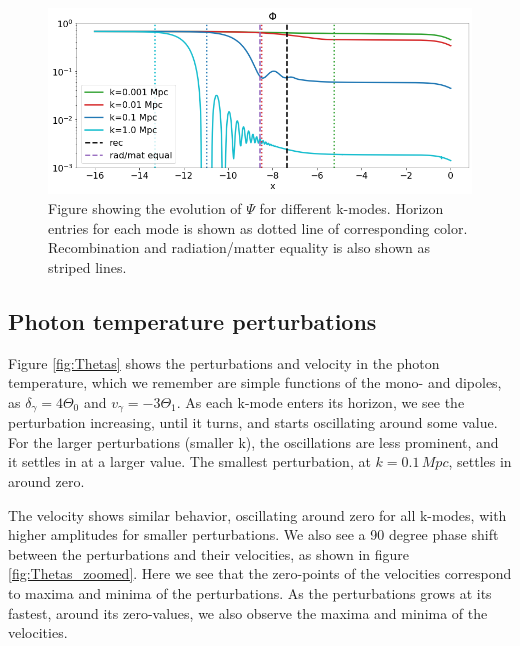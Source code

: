 \documentclass[10pt, a4paper]{article}
\begin{document}
\begin{figure}[H]
    \centering
    \includegraphics[scale=0.45]{../m3_figs/Phi.png}
    \caption{Figure showing the evolution of $\Psi$ for different k-modes. Horizon entries for each mode is shown as dotted line of corresponding color. Recombination and radiation/matter equality is also shown as striped lines.}
    \label{fig:Phi}
\end{figure}


\subsection{Photon temperature perturbations}
Figure \ref{fig:Thetas} shows the perturbations and velocity in the photon temperature, which we remember are simple functions of the mono- and dipoles, as $\delta_\gamma = 4\Theta_0$ and $v_\gamma = -3\Theta_1$. As each k-mode enters its horizon, we see the perturbation increasing, until it turns, and starts oscillating around some value. For the larger perturbations (smaller k), the oscillations are less prominent, and it settles in at a larger value. The smallest perturbation, at $k=0.1\, Mpc$, settles in around zero.

The velocity shows similar behavior, oscillating around zero for all k-modes, with higher amplitudes for smaller perturbations. We also see a 90 degree phase shift between the perturbations and their velocities, as shown in figure \ref{fig:Thetas_zoomed}. Here we see that the zero-points of the velocities correspond to maxima and minima of the perturbations. As the perturbations grows at its fastest, around its zero-values, we also observe the maxima and minima of the velocities.
\end{document}
